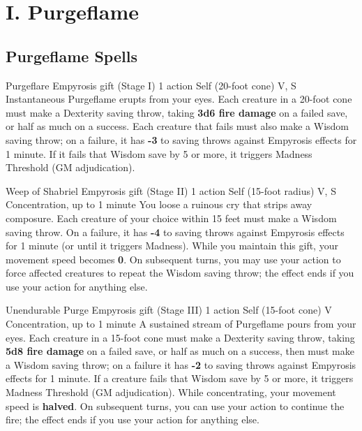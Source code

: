 \section{I. Purgeflame}
\label{app:purgeflame}
\subsection{Purgeflame Spells}

\DndSpellHeader%
  {Purgeflare}
  {Empyrosis gift (Stage I)}
  {1 action}
  {Self (20-foot cone)}
  {V, S}
  {Instantaneous}
Purgeflame erupts from your eyes. Each creature in a 20-foot cone must make a Dexterity saving throw, taking \textbf{3d6 fire damage} on a failed save, or half as much on a success. Each creature that fails must also make a Wisdom saving throw; on a failure, it has \textbf{-3} to saving throws against Empyrosis effects for 1 minute. If it fails that Wisdom save by 5 or more, it triggers Madness Threshold (GM adjudication).

\medskip

\DndSpellHeader%
  {Weep of Shabriel}
  {Empyrosis gift (Stage II)}
  {1 action}
  {Self (15-foot radius)}
  {V, S}
  {Concentration, up to 1 minute}
You loose a ruinous cry that strips away composure. Each creature of your choice within 15 feet must make a Wisdom saving throw. On a failure, it has \textbf{-4} to saving throws against Empyrosis effects for 1 minute (or until it triggers Madness). While you maintain this gift, your movement speed becomes \textbf{0}. On subsequent turns, you may use your action to force affected creatures to repeat the Wisdom saving throw; the effect ends if you use your action for anything else.

\DndSpellHeader%
  {Unendurable Purge}
  {Empyrosis gift (Stage III)}
  {1 action}
  {Self (15-foot cone)}
  {V}
  {Concentration, up to 1 minute}
A sustained stream of Purgeflame pours from your eyes. Each creature in a 15-foot cone must make a Dexterity saving throw, taking \textbf{5d8 fire damage} on a failed save, or half as much on a success, then must make a Wisdom saving throw; on a failure it has \textbf{-2} to saving throws against Empyrosis effects for 1 minute. If a creature fails that Wisdom save by 5 or more, it triggers Madness Threshold (GM adjudication). While concentrating, your movement speed is \textbf{halved}. On subsequent turns, you can use your action to continue the fire; the effect ends if you use your action for anything else.

\medskip

